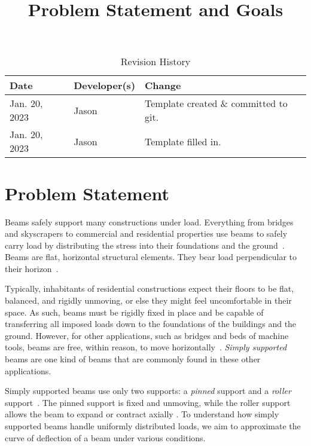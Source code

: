 \documentclass{article}
\title{Problem Statement and Goals\\\progname{}}
\author{\authname}
\date{}
\begin{document}
\maketitle

\begin{table}[hp]
    \caption{Revision History} \label{TblRevisionHistory}
    \begin{tabularx}{\textwidth}{llX}
        \toprule
        \textbf{Date} & \textbf{Developer(s)} & \textbf{Change}                  \\
        \midrule
        Jan. 20, 2023 & Jason                 & Template created \& committed to
        git.
        \\
        Jan. 20, 2023 & Jason                 & Template filled in.              \\
        \bottomrule
    \end{tabularx}
\end{table}

\section{Problem Statement}
\label{problem-statement}

Beams safely support many constructions under load. Everything from bridges and
skyscrapers to commercial and residential properties use beams to safely carry
load by distributing the stress into their foundations and the ground\
\cite{Moscovitch2020}. Beams are flat, horizontal structural elements. They bear
load perpendicular to their horizon\ \cite{Moscovitch2020}.

Typically, inhabitants of residential constructions expect their floors to be
flat, balanced, and rigidly unmoving, or else they might feel uncomfortable in
their space. As such, beams must be rigidly fixed in place and be capable of
transferring all imposed loads down to the foundations of the buildings and the
ground. However, for other applications, such as bridges and beds of machine
tools, beams are free, within reason, to move horizontally\
\cite{BirdChivers1993}. \textit{Simply supported} beams are one kind of beams
that are commonly found in these other applications.

Simply supported beams use only two supports: a \textit{pinned} support and a
\textit{roller} support\ \cite{Lemonis2022}. The pinned support is fixed and
unmoving, while the roller support allows the beam to expand or contract axially
\cite{Lemonis2022}. To understand how simply supported beams handle uniformly
distributed loads, we aim to approximate the curve of deflection of a beam under
various conditions.
\end{document}
